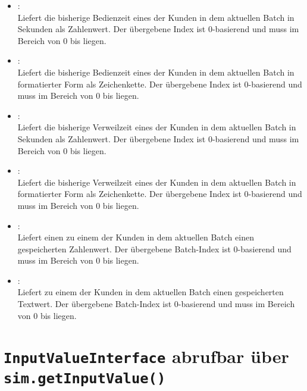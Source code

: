 \begin{itemize}
\item
{}:\\
Liefert die bisherige Bedienzeit eines der Kunden in dem aktuellen Batch in Sekunden als Zahlenwert.
Der übergebene Index ist 0-basierend und muss im Bereich von 0 bis  liegen.

\item
{}:\\
Liefert die bisherige Bedienzeit eines der Kunden in dem aktuellen Batch in formatierter Form als Zeichenkette.
Der übergebene Index ist 0-basierend und muss im Bereich von 0 bis  liegen.
	 
\item
{}:\\
Liefert die bisherige Verweilzeit eines der Kunden in dem aktuellen Batch in Sekunden als Zahlenwert.
Der übergebene Index ist 0-basierend und muss im Bereich von 0 bis  liegen.

\item
{}:\\
Liefert die bisherige Verweilzeit eines der Kunden in dem aktuellen Batch in formatierter Form als Zeichenkette.
Der übergebene Index ist 0-basierend und muss im Bereich von 0 bis  liegen.

\item
{}:\\
Liefert einen zu einem der Kunden in dem aktuellen Batch einen gespeicherten Zahlenwert.
Der übergebene Batch-Index ist 0-basierend und muss im Bereich von 0 bis  liegen.

\item
{}:\\
Liefert zu einem der Kunden in dem aktuellen Batch einen gespeicherten Textwert.
Der übergebene Batch-Index ist 0-basierend und muss im Bereich von 0 bis  liegen.
  
\end{itemize}



\chapter{\texttt{InputValueInterface} abrufbar über \texttt{sim.getInputValue()}}

